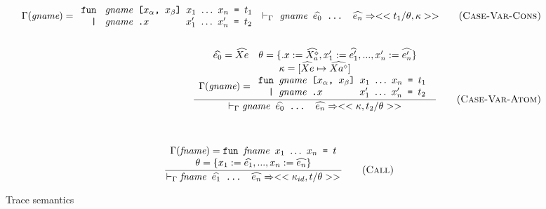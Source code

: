\documentclass[10pt]{../sigplanconf}
\newcommand{\nfrac}[2]{\frac{\displaystyle{#1}}{\displaystyle{#2}}}
\newcommand{\tagsc}[1]{\tag{\scshape #1}}
\begin{document}
\begin{figure}
\begin{align}
{\begin{array}{c}
        \Gamma(\textit{gname}) =
        \begin{array}{l}
          \texttt{fun \textit{\rmfamily gname} [$x_\alpha$, $x_\beta$] $x_1$ $\ldots$ $x_n$ = $t_1$} \\
          \texttt{\ \ | \textit{\rmfamily gname}\ \texttt{.}$x$ \hspace{0.95cm} $x_1'$ $\ldots$ $x_n'$ = $t_2$} \\
        \end{array}
      \end{array}
    }{
      |-_\Gamma \texttt{\textit{\rmfamily gname} $\widehat{e_0}$ ... $\widehat{e_n}$} => <<t_1 / \theta, \kappa>>
    } \tagsc{Case-Var-Cons}
\\\nonumber\\
    \nfrac{
      \begin{array}{c}
        \widehat{e_0} = \widehat{Xe} \quad \theta = \{ .x := \widehat{X_{a}^\diamond}, x_1' := \widehat{e_1'}, ..., x_n' := \widehat{e_n'} \} \\
        \kappa = [\widehat{Xe} \mapsto \widehat{Xa^\diamond}] \\
        \Gamma(\textit{gname}) =
        \begin{array}{l}
          \texttt{fun \textit{\rmfamily gname} [$x_\alpha$, $x_\beta$] $x_1$ $\ldots$ $x_n$ = $t_1$} \\
          \texttt{\ \ | \textit{\rmfamily gname}\ \texttt{.}$x$ \hspace{0.95cm} $x_1'$ $\ldots$ $x_n'$ = $t_2$} \\
        \end{array}
      \end{array}
    }{
      |-_\Gamma \texttt{\textit{\rmfamily gname} $\widehat{e_0}$ ... $\widehat{e_n}$} => <<\kappa, t_2 / \theta>>
    } \tagsc{Case-Var-Atom}
  \end{align}

  ~\newline

  \begin{equation}
    \nfrac{
      \begin{array}{c}
        \Gamma(\textit{fname}) =
          \texttt{fun \textit{\rmfamily fname} $x_1$ $\ldots$ $x_n$ = $t$} \\
        \theta = \{ x_1 := \widehat{e_1}, ..., x_n := \widehat{e_n} \}
      \end{array}
    }{
      |-_\Gamma \texttt{\textit{\rmfamily fname} $\widehat{e_1}$ ... $\widehat{e_n}$} => << \kappa_{id}, t / \theta>>
    } \tagsc{Call}
  \end{equation}

  \caption{Trace semantics}
  \label{fig:tracing}
\end{figure}
\end{document}
